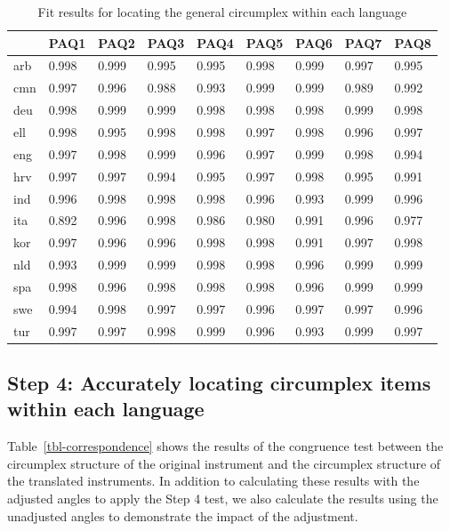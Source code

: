 \documentclass[
  authoryear,
  preprint,
  3p]{elsarticle}
\begin{document}
\begin{longtable}[]{@{}lllllllll@{}}

\caption{\label{tbl-corr-angles-fit}Fit results for locating the general
circumplex within each language}

\tabularnewline

\toprule\noalign{}
& PAQ1 & PAQ2 & PAQ3 & PAQ4 & PAQ5 & PAQ6 & PAQ7 & PAQ8 \\
\midrule\noalign{}
\endhead
\bottomrule\noalign{}
\endlastfoot
arb & 0.998 & 0.999 & 0.995 & 0.995 & 0.998 & 0.999 & 0.997 & 0.995 \\
cmn & 0.997 & 0.996 & 0.988 & 0.993 & 0.999 & 0.999 & 0.989 & 0.992 \\
deu & 0.998 & 0.999 & 0.999 & 0.998 & 0.998 & 0.998 & 0.999 & 0.998 \\
ell & 0.998 & 0.995 & 0.998 & 0.998 & 0.997 & 0.998 & 0.996 & 0.997 \\
eng & 0.997 & 0.998 & 0.999 & 0.996 & 0.997 & 0.999 & 0.998 & 0.994 \\
hrv & 0.997 & 0.997 & 0.994 & 0.995 & 0.997 & 0.998 & 0.995 & 0.991 \\
ind & 0.996 & 0.998 & 0.998 & 0.998 & 0.996 & 0.993 & 0.999 & 0.996 \\
ita & 0.892 & 0.996 & 0.998 & 0.986 & 0.980 & 0.991 & 0.996 & 0.977 \\
kor & 0.997 & 0.996 & 0.996 & 0.998 & 0.998 & 0.991 & 0.997 & 0.998 \\
nld & 0.993 & 0.999 & 0.999 & 0.998 & 0.998 & 0.996 & 0.999 & 0.999 \\
spa & 0.998 & 0.996 & 0.998 & 0.998 & 0.998 & 0.996 & 0.999 & 0.999 \\
swe & 0.994 & 0.998 & 0.997 & 0.997 & 0.996 & 0.997 & 0.997 & 0.996 \\
tur & 0.997 & 0.997 & 0.998 & 0.999 & 0.996 & 0.993 & 0.999 & 0.997 \\

\end{longtable}

\subsection{Step 4: Accurately locating circumplex items within each
language}\label{step-4-accurately-locating-circumplex-items-within-each-language-1}

Table~\ref{tbl-correspondence} shows the results of the congruence test
between the circumplex structure of the original instrument and the
circumplex structure of the translated instruments. In addition to
calculating these results with the adjusted angles to apply the Step 4
test, we also calculate the results using the unadjusted angles to
demonstrate the impact of the adjustment.
\end{document}
